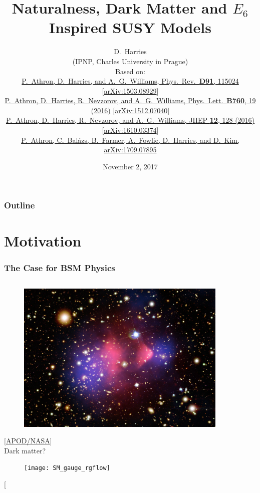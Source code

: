\documentclass[10pt,aspectratio=169]{beamer}
\title{Naturalness, Dark Matter and $E_6$ Inspired SUSY Models}
\author{D.~Harries\\
  {\scriptsize
  (IPNP, Charles University in Prague)}\\
  \vspace{25pt}
  { \scriptsize
    Based on:\\[3mm]
  }
  { \tiny
    \href{https://doi.org/10.1103/PhysRevD.91.115024}{%
      P.~Athron, D.~Harries, and A.~G.~Williams, Phys.~Rev.~\textbf{D91},
      115024}
         [\href{https://arxiv.org/abs/1503.08929}{arXiv:1503.08929}]\\[2mm]
    \href{https://doi.org/10.1016/j.physletb.2016.06.040}{%
      P.~Athron, D.~Harries, R.~Nevzorov, and A.~G.~Williams,
      Phys.~Lett.~\textbf{B760}, 19 (2016)}
         [\href{https://arxiv.org/abs/1512.07040}{arXiv:1512.07040}]\\[2mm]
    \href{https://doi.org/10.1007/JHEP12(2016)128}{%
      P.~Athron, D.~Harries, R.~Nevzorov, and A.~G.~Williams,
      JHEP \textbf{12}, 128 (2016)}
         [\href{https://arxiv.org/abs/1610.03374}{arXiv:1610.03374}]\\[0.3mm]
    \href{https://arxiv.org/abs/1709.07895}{%
      P.~Athron, C.~Bal\'{a}zs, B.~Farmer, A.~Fowlie, D.~Harries,
      and D.~Kim, arXiv:1709.07895}
  }
  }
\date[TU Dresden 2017]{November 2, 2017}
\begin{document}
\begin{frame}[plain]
  \titlepage
\end{frame}

\begin{frame}
  \frametitle{Outline}
  \tableofcontents
\end{frame}

\section{Motivation}

\begin{frame}
  \frametitle{The Case for BSM Physics}
  \begin{columns}[t]
    \begin{column}{0.3\textwidth}
      \vspace*{-15pt}
      \begin{figure}
        \centering
        \includegraphics[width=0.9\textwidth]{bulletcluster}
      \end{figure}
      \vspace{-25pt}
      \begin{center}
        {\tiny [\href{https://apod.nasa.gov/apod/ap060824.html}{APOD/NASA}]} \\
        Dark matter?
      \end{center}
      \vspace{-15pt}
      \begin{figure}
        \centering
        \texttt{[image: SM\_gauge\_rgflow]}
      \end{figure}
      \vspace{-25pt}
      \begin{center}
        {\tiny [\href{http://flexiblesusy.hepforge.org/images.html}{%
}}
\end{center}
\end{column}
\end{columns}
\end{frame}
\end{document}
